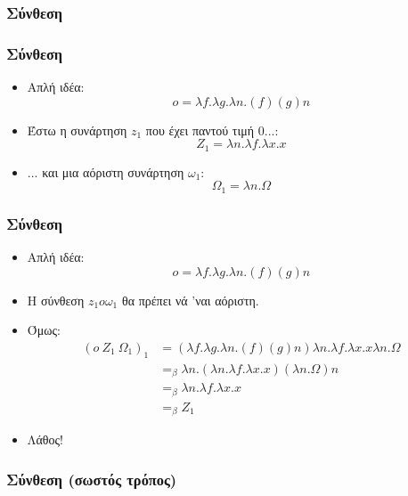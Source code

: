\documentclass{beamer}
\begin{document}
\subsubsection{Σύνθεση}
\begin{frame}
        \frametitle{Σύνθεση}
        \begin{itemize}
                \item Απλή ιδέα: $$o = \lambda f. \lambda g. \lambda n . (f) (g) n$$
                \pause
                \item Έστω η συνάρτηση $z_1$ που έχει παντού τιμή 0...:
                    $$Z_1 = \lambda n. \lambda f. \lambda x . x $$
                \pause
                \item ... και μια αόριστη συνάρτηση $\omega_1$:
                	$$\Omega_1 = \lambda n. \Omega$$
        \end{itemize}
\end{frame}
\begin{frame}
        \frametitle{Σύνθεση}
        \begin{itemize}
                \item Απλή ιδέα: $$o = \lambda f. \lambda g. \lambda n . (f) (g) n$$
        		\item Η σύνθεση $z_1 o \omega_1$ θα πρέπει νά 'ναι αόριστη.
            	\pause
        		\item Όμως:
        		$$\begin{array}{ll}
        		  (o\:Z_1\:\Omega_1)_1 &= (\lambda f. \lambda g. \lambda n . (f) (g) n) \lambda n. \lambda f. \lambda x . x \lambda n. \Omega \\
        		                       &=_\beta \lambda n . (\lambda n. \lambda f. \lambda x . x) (\lambda n. \Omega) n \\
        		                       &=_\beta \lambda n . \lambda f. \lambda x . x \\
        		                       &=_\beta Z_1
        		\end{array}$$
            	\pause
        		\item Λάθος!
        \end{itemize}
\end{frame}

\subsubsection{Σύνθεση (σωστός τρόπος)}
\end{document}
